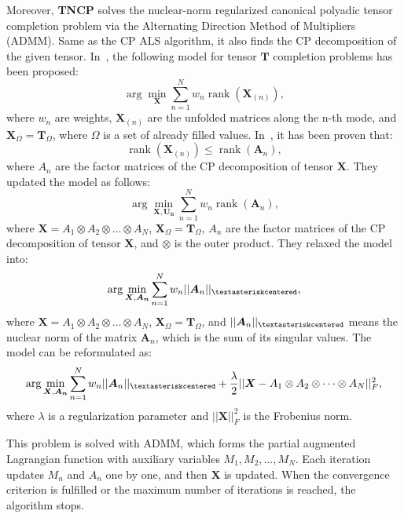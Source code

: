 \documentclass[thesis=M,english]{FITthesis}[2019/12/23]
\DeclareMathOperator{\rank}{rank}
\begin{document}
Moreover, \textbf{TNCP} solves the nuclear-norm regularized canonical polyadic tensor completion problem via the Alternating Direction Method of Multipliers (ADMM). Same as the CP ALS algorithm, it also finds the CP decomposition of the given tensor. In~\cite{tncp_rank_model}, the following model for tensor $\boldsymbol{T}$ completion problems has been proposed: $$\arg \min_{\boldsymbol{X}} \sum_{n = 1}^N w_n \rank(\boldsymbol{X}_{(n)}),$$ where $w_n$ are weights, $\boldsymbol{X}_{(n)}$ are the unfolded matrices along the n-th mode, and $\boldsymbol{X}_\Omega = \boldsymbol{T}_\Omega$, where $\Omega$ is a set of already filled values. In~\cite{tncp}, it has been proven that: $$\rank(\boldsymbol{X}_{(n)}) \leq \rank(\boldsymbol{A}_n),$$ where $A_n$ are the factor matrices of the CP decomposition of tensor $\boldsymbol{X}$. They updated the model as follows: $$\arg \min_{\boldsymbol{X}, \boldsymbol{U_n}} \sum_{n = 1}^N w_n \rank(\boldsymbol{A}_n),$$ where $\boldsymbol{X} = A_1 \otimes A_2 \otimes \dots \otimes A_N$, $\boldsymbol{X}_\Omega = \boldsymbol{T}_\Omega$, $A_n$  are the factor matrices of the CP decomposition of tensor $\boldsymbol{X}$, and $\otimes$ is the outer product. They relaxed the model into: $$\arg \min_{\boldsymbol{X}, \boldsymbol{A_n}} \sum_{n = 1}^N w_n ||\boldsymbol{A}_n||_{\textasteriskcentered},$$ where $\boldsymbol{X} = A_1 \otimes A_2 \otimes \dots \otimes A_N$, $\boldsymbol{X}_\Omega = \boldsymbol{T}_\Omega$, and $||\boldsymbol{A}_n||_{\textasteriskcentered}$ means the nuclear norm of the matrix $\boldsymbol{A}_n$, which is the sum of its singular values. The model can be reformulated as: $$\arg \min_{\boldsymbol{X}, \boldsymbol{A_n}} \sum_{n = 1}^N w_n ||\boldsymbol{A}_n||_{\textasteriskcentered} + \frac{\lambda}{2} ||\boldsymbol{X} - A_1 \otimes A_2 \otimes \dots \otimes A_N||_F^2,$$ where $\lambda$ is a regularization parameter and $||\boldsymbol{X}||_F^2$ is the Frobenius norm. 

This problem is solved with ADMM, which forms the partial augmented Lagrangian function with auxiliary variables $M_1, M_2, \dots, M_N$. Each iteration updates $M_n$ and $A_n$ one by one, and then $\boldsymbol{X}$ is updated. When the convergence criterion is fulfilled or the maximum number of iterations is reached, the algorithm stops.
\end{document}
